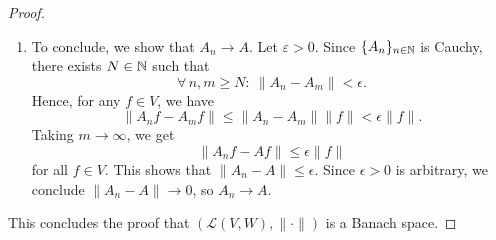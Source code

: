 \begin{proof}
\begin{enumerate}[label=(c.\roman*)]
  $z\in \C$. Then
  \begin{align*}
  A(zf+g) &:= \lim_{n\to \infty} A_n(zf+g)\\
  & = \lim_{n\to \infty} (zA_nf+A_ng)\\
  & = z\lim_{n\to \infty} A_nf+\lim_{n\to \infty}A_ng\\
  &=: zAf+Ag
  \end{align*}
  where we have used the linearity of each $A_n$ and part (i) and (ii)
  of .
  Now we prove that \(A\) is bounded.
  First recall that $\{A_n\}_{n\in \N}$ is a Cauchy sequence. It
  follows that \(\{\|A_n\|\}_{n\in\N}\) is also Cauchy. Indeed, for
  \(\epsilon>0\) there exists $N\in \N$ such that
  \begin{equation*}
  \forall \, n,m \geq N : \ \|A_n-A_m\|<\varepsilon.
  \end{equation*}
  It follows that
  \begin{equation*}
  \bigl| \|A_n\|-\|A_m\|\bigr| \leq  \|A_n-A_m\|<\varepsilon
  \end{equation*}
  for all $n,m \geq N$.
  Since \(\R\) is complete, \(\{\|A_n\|\}_{n\in\N}\) converges to a
  finite \(r\).
  Now, by part (ii) and (iii) of , we get
  \begin{align*}
  \|Af\|_W  & = \lim_{n\to \infty} \|A_nf\|_W\\
  & \leq \lim_{n\to \infty} \|A_n\|_W\|f\|_V \\
  & = \|f\|_V \lim_{n\to \infty} \|A_n\|
  \end{align*}
  for any $f\in V$.
  It follows that \(A\) is bounded and
  \begin{equation*}
  \|A\|\leq \lim_{n\to \infty} \|A_n\|
  \end{equation*}

\item
  To conclude, we show that $A_n\to A$.
  Let $\varepsilon >0$. 
  Since $\{A_n\}_{n\in \N}$ is Cauchy, there exists $N\in \N$ such that
  \begin{equation*}
  \forall \, n,m\geq N : \ \|A_n-A_m\| < \epsilon.
  \end{equation*}
  Hence, for any \(f\in V\), we have
  \begin{equation}
    \|A_nf-A_mf\|\leq \|A_n-A_m\|\|f\| <\epsilon\|f\|
  .\end{equation}
  Taking \(m\to\infty\), we get
  \begin{equation}
    \|A_nf-Af\|\leq \epsilon\|f\|
  \end{equation}
  for all \(f\in V\).
  This shows that \(\|A_n-A\|\leq\epsilon\). Since \(\epsilon>0\) is
  arbitrary, we conclude \(\|A_n-A\|\to 0\), so \(A_n\to A\).
\end{enumerate}
This concludes the proof that $(\mathcal{L}(V,W),\|\cdot\|)$ is a Banach space.
\end{proof}

